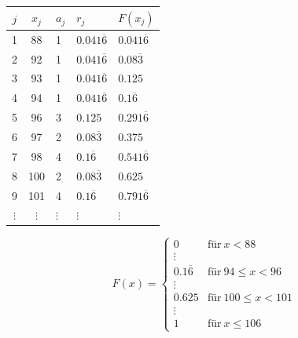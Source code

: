 \begin{table}[H]
\centering
\begin{tabular}{c|clll}
     $j$      & $x_j$ & $a_j$     & $r_j$               & $F(x_j)$ \\ \hline
     1        & 88    & 1         & $0.041\overline{6}$ & $0.041\overline{6}$ \\
     2        & 92    & 1         & $0.041\overline{6}$ & $0.08\overline{3}$  \\
     3        & 93    & 1         & $0.041\overline{6}$ & $0.125$             \\
     4        & 94    & 1         & $0.041\overline{6}$ & $0.1\overline{6}$   \\
     5        & 96    & 3         & $0.125$             & $0.291\overline{6}$ \\
     6        & 97    & 2         & $0.08\overline{3}$  & $0.375$             \\
     7        & 98    & 4         & $0.1\overline{6}$   & $0.541\overline{6}$ \\
     8        & 100   & 2         & $0.08\overline{3}$  & $0.625$             \\
     9        & 101   & 4         & $0.1\overline{6}$   & $0.791\overline{6}$ \\
     $\vdots$ & $\vdots$ & $\vdots$  & $\vdots$            & $\vdots$
\end{tabular}
\end{table}

$$
F(x) = \begin{cases}
    0      & \text{für}~x<88 \\
    \vdots & \\
    0.1\overline{6} & \text{für}~94\le x<96 \\
    \vdots & \\
    0.625  & \text{für}~100\le x<101 \\
    \vdots & \\
    1      & \text{für}~x\le 106
\end{cases}
$$

